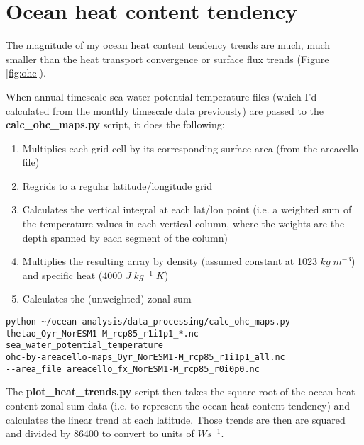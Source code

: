 \section{Ocean heat content tendency}

The magnitude of my ocean heat content tendency trends are much, much smaller than the heat transport convergence or surface flux trends (Figure \ref{fig:ohc}). 

When annual timescale sea water potential temperature files (which I'd calculated from the monthly timescale data previously) are passed to the \textbf{calc_ohc_maps.py} script, it does the following:
\begin{enumerate}
\item Multiplies each grid cell by its corresponding surface area (from the areacello file)
\item Regrids to a regular latitude/longitude grid
\item Calculates the vertical integral at each lat/lon point (i.e. a weighted sum of the temperature values in each vertical column, where the weights are the depth spanned by each segment of the column)
\item Multiplies the resulting array by density (assumed constant at 1023 $kg\; m^{-3}$) and specific heat (4000 $J\; kg^{-1}\; K$)
\item Calculates the (unweighted) zonal sum
\end{enumerate}

\begin{verbatim}
python ~/ocean-analysis/data_processing/calc_ohc_maps.py 
thetao_Oyr_NorESM1-M_rcp85_r1i1p1_*.nc 
sea_water_potential_temperature 
ohc-by-areacello-maps_Oyr_NorESM1-M_rcp85_r1i1p1_all.nc 
--area_file areacello_fx_NorESM1-M_rcp85_r0i0p0.nc
\end{verbatim}

The \textbf{plot_heat_trends.py} script then takes the square root of the ocean heat content zonal sum data (i.e. to represent the ocean heat content tendency) and calculates the linear trend at each latitude. Those trends are then are squared and divided by 86400 to convert to units of $Ws^{-1}$. 
